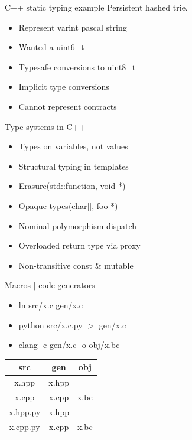 \documentclass[20pt]{beamer}
\begin{document}
\begin{frame}{C++ static typing example}
  Persistent hashed trie.
  \begin{itemize}
  \item Represent varint pascal string
  \item Wanted a uint6\_t
  \item Typesafe conversions to uint8\_t
  \item Implicit type conversions
  \item Cannot represent contracts
  \end{itemize}
\end{frame}

\begin{frame}{Type systems in C++}
  \begin{itemize}
  \item Types on variables, not values
  \item Structural typing in templates
  \item Erasure(std::function, void *)
  \item Opaque types(char[], foo *)
  \item Nominal polymorphism dispatch
  \item Overloaded return type via proxy
  \item Non-transitive const \& mutable
  \end{itemize}
\end{frame}

\begin{frame}{Macros $|$ code generators}
  \begin{itemize}
  \item ln src/x.c gen/x.c
  \item python src/x.c.py $>$ gen/x.c
  \item clang -c gen/x.c -o obj/x.bc
  \end{itemize}

  \begin{center}
    \begin{tabular}{ |c|c|c| }
      \hline
      src & gen & obj \\
      \hline
      x.hpp & x.hpp & \\
      x.cpp & x.cpp & x.bc \\
      x.hpp.py & x.hpp & \\
      x.cpp.py & x.cpp & x.bc \\
      \hline
    \end{tabular}
  \end{center}
\end{frame}
\end{document}
